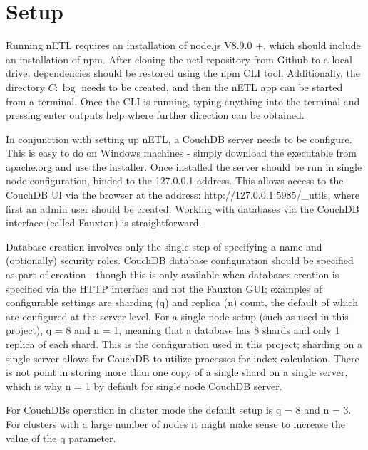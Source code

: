 \section{Setup}
Running nETL requires an installation of node.js V8.9.0 +, which should include an installation of npm. After cloning the netl repository from Github to a local drive, dependencies should be restored using the npm CLI tool. Additionally, the directory $C:\log$ needs to be created, and then the nETL app can be started from a terminal. Once the CLI is running, typing anything into the terminal and pressing enter outputs help where further direction can be obtained.

In conjunction with setting up nETL, a CouchDB server needs to be configure. This is easy to do on Windows machines - simply download the executable from apache.org and use the installer. Once installed the server should be run in single node configuration, binded to the 127.0.0.1 address. This allows access to the CouchDB UI via the browser at the address: http://127.0.0.1:5985/\_utils, where first an admin user should be created. Working with databases via the CouchDB interface (called Fauxton) is straightforward.

Database creation involves only the single step of specifying a name and (optionally) security roles. CouchDB database configuration should be specified as part of creation - though this is only available when databases creation is specified via the HTTP interface and not the Fauxton GUI; examples of configurable settings are sharding (q) and replica (n) count, the default of which are configured at the server level. For a single node setup (such as used in this project), q = 8 and n = 1, meaning that a database has 8 shards and only 1 replica of each shard. This is the configuration used in this project; sharding on a single server allows for CouchDB to utilize processes for index calculation. There is not point in storing more than one copy of a single shard on a single server, which is why n = 1 by default for single node CouchDB server.

For CouchDBs operation in cluster mode the default setup is q = 8 and n = 3. For clusters with a large number of nodes it might make sense to increase the value of the q parameter.